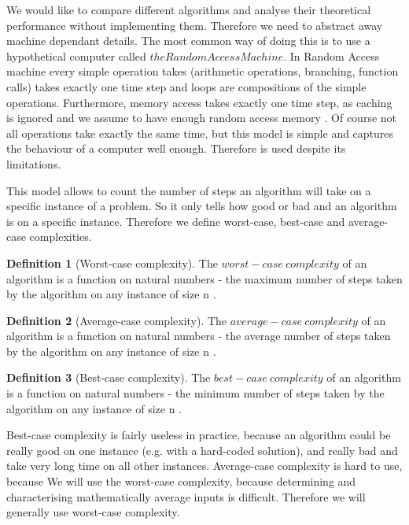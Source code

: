 \documentclass{report}
\theoremstyle{plain}
\theoremstyle{definition}
\newtheorem{definition}{Definition}
\theoremstyle{remark}
\numberwithin{definition}{chapter}
\numberwithin{example}{chapter}
\numberwithin{figure}{chapter}
\begin{document}
We would like to compare different algorithms and analyse their theoretical performance without implementing them. Therefore we need to abstract away machine dependant details. The most common way of doing this is to use a hypothetical computer called $the Random Access Machine$. In Random Access machine every simple operation takes (arithmetic operations, branching, function calls) takes exactly one time step and loops are compositions of the simple operations. Furthermore, memory access takes exactly one time step, as caching is ignored and we assume to have enough random access memory \cite{skiena504algorithm}. Of course not all operations take exactly the same time, but this model is simple and captures the behaviour of a computer well enough. Therefore is used despite its limitations.

This model allows to count the number of steps an algorithm will take on a specific instance of a problem. So it only tells how good or bad and an algorithm is on a specific instance. Therefore we define worst-case, best-case and average-case complexities.

\begin{definition}[Worst-case complexity]
The $worst-case \ complexity$ of an algorithm is a function on natural numbers - the maximum number of steps taken by the algorithm on any instance of size n \cite{skiena504algorithm}.
\end{definition}

\begin{definition}[Average-case complexity]
The $average-case \ complexity$ of an algorithm is a function on natural numbers - the average number of steps taken by the algorithm on any instance of size n \cite{skiena504algorithm}.
\end{definition}

\begin{definition}[Best-case complexity]
The $best-case \ complexity$ of an algorithm is a function on natural numbers - the minimum number of steps taken by the algorithm on any instance of size n \cite{skiena504algorithm}.
\end{definition}

Best-case complexity is fairly useless in practice, because an algorithm could be really good on one instance (e.g. with a hard-coded solution), and really bad and take very long time on all other instances. Average-case complexity is hard to use, because 
We will use the worst-case complexity, because determining and characterising mathematically average inputs is difficult. Therefore we will generally use worst-case complexity.
\end{document}
